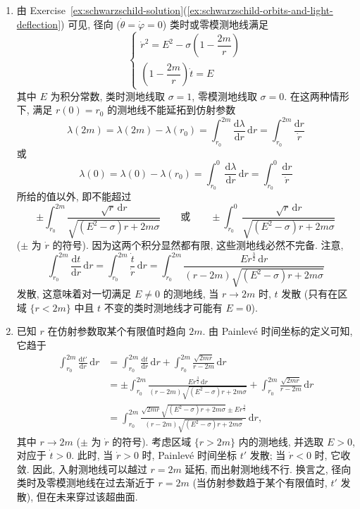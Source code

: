\begin{description}[font=\normalfont,leftmargin=2em,labelwidth=1.5em]
\begin{enumerate}[label=(\alph*),ref=\alph*,leftmargin=*]
\item 由 Exercise~\ref{ex:schwarzschild-solution}(\ref{ex:schwarzschild-orbits-and-light-deflection}) 可见, 径向 ($\dot\theta=\dot\varphi=0$) 类时或零模测地线满足
\[
  \begin{cases}
    \dot r^2=E^2-\sigma\left(1-\dfrac{2m}{r}\right)\\[.6ex]
    \left(1-\dfrac{2m}{r}\right)\dot t=E
  \end{cases}
\]
其中 $E$ 为积分常数, 类时测地线取 $\sigma=1$, 零模测地线取 $\sigma=0$. 在这两种情形下, 满足 $r(0)=r_0$ 的测地线不能延拓到仿射参数
\[
  \lambda(2m)=\lambda(2m)-\lambda(r_0)
     =\int_{r_0}^{2m}\frac{\mathrm{d}\lambda}{\mathrm{d}r}\,\mathrm{d}r
     =\int_{r_0}^{2m}\frac{\mathrm{d}r}{\dot r}
\]
或
\[
  \lambda(0)=\lambda(0)-\lambda(r_0)
     =\int_{r_0}^0\frac{\mathrm{d}\lambda}{\mathrm{d}r}\,\mathrm{d}r
     =\int_{r_0}^0\frac{\mathrm{d}r}{\dot r}
\]
所给的值以外, 即不能超过
\[
  \pm\int_{r_0}^{2m}\frac{\sqrt r\,\mathrm{d}r}{\sqrt{(E^2-\sigma)r+2m\sigma}}
  \qquad\text{或}\qquad
  \pm\int_{r_0}^0\frac{\sqrt r\,\mathrm{d}r}{\sqrt{(E^2-\sigma)r+2m\sigma}}
\]
($\pm$ 为 $\dot r$ 的符号). 因为这两个积分显然都有限, 这些测地线必然不完备. 注意,
\[
  \int_{r_0}^{2m}\frac{\mathrm{d}t}{\mathrm{d}r}\,\mathrm{d}r
  =\int_{r_0}^{2m}\frac{\dot t}{\dot r}\,\mathrm{d}r
  =\int_{r_0}^{2m}\frac{Er^{\frac{3}{2}}\,\mathrm{d}r}{(r-2m)\sqrt{(E^2-\sigma)r+2m\sigma}}
\]
发散, 这意味着对一切满足 $E\ne0$ 的测地线, 当 $r\to2m$ 时, $t$ 发散 (只有在区域 $\{r<2m\}$ 中且 $t$ 不变的类时测地线才可能有 $E=0$).
\item 已知 $r$ 在仿射参数取某个有限值时趋向 $2m$. 由 Painlevé 时间坐标的定义可知, 它趋于
\begin{align*}
  \int_{r_0}^{2m}\frac{\mathrm{d}t'}{\mathrm{d}r}\,\mathrm{d}r
    &=\int_{r_0}^{2m}\frac{\mathrm{d}t}{\mathrm{d}r}\,\mathrm{d}r
     +\int_{r_0}^{2m}\frac{\sqrt{2mr}}{r-2m}\,\mathrm{d}r\\
    &=\pm\int_{r_0}^{2m}\frac{Er^{\frac{3}{2}}\,\mathrm{d}r}{(r-2m)\sqrt{(E^2-\sigma)r+2m\sigma}}
     +\int_{r_0}^{2m}\frac{\sqrt{2mr}}{r-2m}\,\mathrm{d}r\\
    &=\int_{r_0}^{2m}\frac{\sqrt{2mr}\sqrt{(E^2-\sigma)r+2m\sigma}\pm Er^{\frac{3}{2}}}
                         {(r-2m)\sqrt{(E^2-\sigma)r+2m\sigma}}\,\mathrm{d}r,
\end{align*}
其中 $r\to2m$ ($\pm$ 为 $\dot r$ 的符号). 考虑区域 $\{r>2m\}$ 内的测地线, 并选取 $E>0$, 对应于 $\dot t>0$. 此时, 当 $\dot r>0$ 时, Painlevé 时间坐标 $t'$ 发散; 当 $\dot r<0$ 时, 它收敛. 因此, 入射测地线可以越过 $r=2m$ 延拓, 而出射测地线不行. 换言之, 径向类时及零模测地线在过去渐近于 $r=2m$ (当仿射参数趋于某个有限值时, $t'$ 发散), 但在未来穿过该超曲面.

\end{enumerate}
\end{description}
